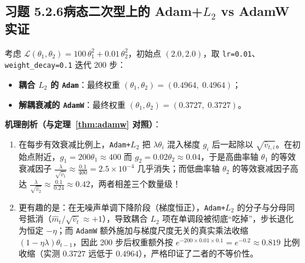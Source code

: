 \subsection*{习题 5.2.6\quad 病态二次型上的 Adam+$L_2$ vs AdamW 实证}
考虑 $\mathcal{L}(\theta_1, \theta_2) = 100\,\theta_1^2 + 0.01\,\theta_2^2$，初始点 $(2.0, 2.0)$，取 \texttt{lr=0.01}、\texttt{weight\_decay=0.1} 迭代 200 步：
\begin{itemize}
  \item \textbf{耦合 $L_2$ 的 \texttt{Adam}}：最终权重 $(\theta_1, \theta_2) = (0.4964,\; 0.4964)$；
  \item \textbf{解耦衰减的 \texttt{AdamW}}：最终权重 $(\theta_1, \theta_2) = (0.3727,\; 0.3727)$。
\end{itemize}
\textbf{机理剖析（与定理~\ref{thm:adamw} 对照）}：
\begin{enumerate}[label=(\arabic*), leftmargin=1.8em]
  \item 在每步有效衰减比例上，\texttt{Adam+$L_2$} 把 $\lambda \theta_i$ 混入梯度 $g_i$ 后一起除以 $\sqrt{\hat{v}_{t,i}}$。在初始点附近，$g_1 = 200\theta_1 \approx 400$ 而 $g_2 = 0.02\theta_2 \approx 0.04$，于是高曲率轴 $\theta_1$ 的等效衰减因子 $\frac{\lambda}{\sqrt{\hat{v}_1}} \approx \frac{0.1}{400} = 2.5\times 10^{-4}$ 几乎消失；而低曲率轴 $\theta_2$ 的等效衰减因子高达 $\frac{\lambda}{\sqrt{\hat{v}_2}} \approx \frac{0.1}{0.24} \approx 0.42$，两者相差三个数量级！
  \item 更有趣的是：在无噪声单调下降阶段（梯度恒正），\texttt{Adam+$L_2$} 的分子与分母同号抵消（$\hat{m}_t / \sqrt{\hat{v}_t} \approx +1$），导致耦合 $L_2$ 项在单调段被彻底“吃掉”，步长退化为恒定 $-\eta$；而 \texttt{AdamW} 额外施加与梯度尺度无关的真实乘法收缩 $(1 - \eta\lambda)\theta_{t-1}$，因此 200 步后权重额外按 $e^{-200 \times 0.01 \times 0.1} = e^{-0.2} \approx 0.819$ 比例收缩（实测 $0.3727$ 远低于 $0.4964$），严格印证了二者的不等价性。
\end{enumerate}

